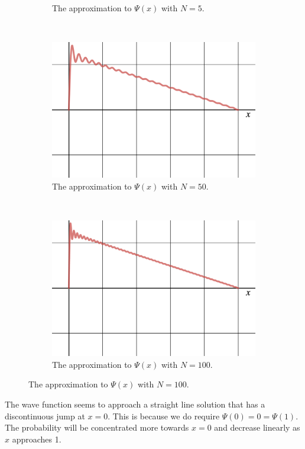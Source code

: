 \documentclass[12pt]{article} %
\begin{document}
\begin{solution}
\begin{enumerate}[(a)]
\begin{figure}[H]
\begin{subfigure}[h]{0.48\textwidth}
			\caption{The approximation to $\Psi(x)$ with $N=5$.}
		\end{subfigure}
		\\
		\begin{subfigure}[h]{0.48\textwidth}
			\centering
			\includegraphics[width=.8\textwidth]{figures/n=50.png}
			\caption{The approximation to $\Psi(x)$ with $N=50$.}
		\end{subfigure}
		~
		\begin{subfigure}[h]{0.48\textwidth}
			\centering
			\includegraphics[width=.8\textwidth]{figures/n=100.png}
			\caption{The approximation to $\Psi(x)$ with $N=100$.}
		\end{subfigure}
	\end{figure}
	\end{enumerate}
\item The wave function seems to approach a straight line solution that has a discontinuous jump at $x=0$. This is because we do require $\Psi(0)=0=\Psi(1)$. The probability will be concentrated more towards $x=0$ and decrease linearly as $x$ approaches 1.
\end{solution}
\vspace*{1cm}
\end{document}
